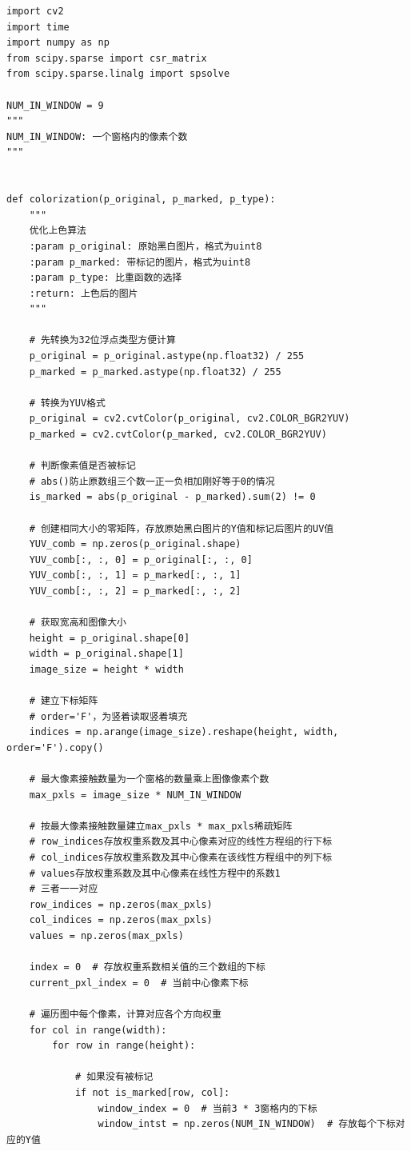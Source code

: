 \documentclass[12pt, a4paper, oneside]{report}
\begin{document}
	\begin{lstlisting}
import cv2
import time
import numpy as np
from scipy.sparse import csr_matrix
from scipy.sparse.linalg import spsolve

NUM_IN_WINDOW = 9
"""
NUM_IN_WINDOW: 一个窗格内的像素个数
"""


def colorization(p_original, p_marked, p_type):
	"""
	优化上色算法
	:param p_original: 原始黑白图片，格式为uint8
	:param p_marked: 带标记的图片，格式为uint8
	:param p_type: 比重函数的选择
	:return: 上色后的图片
	"""

	# 先转换为32位浮点类型方便计算
	p_original = p_original.astype(np.float32) / 255
	p_marked = p_marked.astype(np.float32) / 255
	
	# 转换为YUV格式
	p_original = cv2.cvtColor(p_original, cv2.COLOR_BGR2YUV)
	p_marked = cv2.cvtColor(p_marked, cv2.COLOR_BGR2YUV)
	
	# 判断像素值是否被标记
	# abs()防止原数组三个数一正一负相加刚好等于0的情况
	is_marked = abs(p_original - p_marked).sum(2) != 0
	
	# 创建相同大小的零矩阵，存放原始黑白图片的Y值和标记后图片的UV值
	YUV_comb = np.zeros(p_original.shape)
	YUV_comb[:, :, 0] = p_original[:, :, 0]
	YUV_comb[:, :, 1] = p_marked[:, :, 1]
	YUV_comb[:, :, 2] = p_marked[:, :, 2]
	
	# 获取宽高和图像大小
	height = p_original.shape[0]
	width = p_original.shape[1]
	image_size = height * width
	
	# 建立下标矩阵
	# order='F'，为竖着读取竖着填充
	indices = np.arange(image_size).reshape(height, width, order='F').copy()
	
	# 最大像素接触数量为一个窗格的数量乘上图像像素个数
	max_pxls = image_size * NUM_IN_WINDOW
	
	# 按最大像素接触数量建立max_pxls * max_pxls稀疏矩阵
	# row_indices存放权重系数及其中心像素对应的线性方程组的行下标
	# col_indices存放权重系数及其中心像素在该线性方程组中的列下标
	# values存放权重系数及其中心像素在线性方程中的系数1
	# 三者一一对应
	row_indices = np.zeros(max_pxls)
	col_indices = np.zeros(max_pxls)
	values = np.zeros(max_pxls)
	
	index = 0  # 存放权重系数相关值的三个数组的下标
	current_pxl_index = 0  # 当前中心像素下标
	
	# 遍历图中每个像素，计算对应各个方向权重
	for col in range(width):
		for row in range(height):
			
			# 如果没有被标记
			if not is_marked[row, col]:
				window_index = 0  # 当前3 * 3窗格内的下标
				window_intst = np.zeros(NUM_IN_WINDOW)  # 存放每个下标对应的Y值
				

\end{lstlisting}
\end{document}
